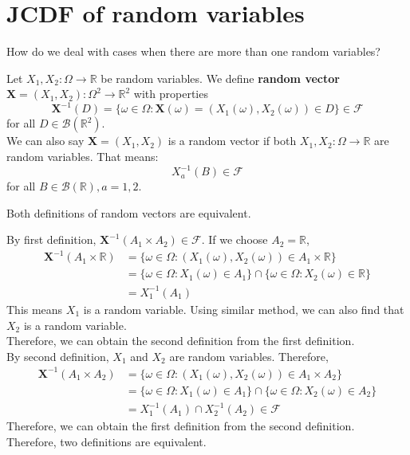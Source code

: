 \documentclass{huhtakm-template-book}
\begin{document}
\section{JCDF of random variables}
    How do we deal with cases when there are more than one random variables?
    \begin{defn}
	Let $X_{1},X_{2}:\Omega\to\mathbb{R}$ be random variables. We define \textbf{random vector} $\mathbf{X}=(X_{1},X_{2}):\Omega^{2}\to\mathbb{R}^{2}$ with properties
        \begin{equation*}
		    \mathbf{X}^{-1}(D)=\{\omega\in\Omega:\mathbf{X}(\omega)=(X_{1}(\omega),X_{2}(\omega))\in D\}\in\mathcal{F}
        \end{equation*}
        for all $D\in\mathcal{B}(\mathbb{R}^{2})$.\\
	    We can also say $\mathbf{X}=(X_{1},X_{2})$ is a random vector if both $X_{1},X_{2}:\Omega\to\mathbb{R}$ are random variables. That means:
        \begin{equation*}
            X_{a}^{-1}(B)\in\mathcal{F}
        \end{equation*}
        for all $B\in\mathcal{B}(\mathbb{R}),a=1,2$.
    \end{defn}
    \begin{cla}
        Both definitions of random vectors are equivalent.
    \end{cla}
    \begin{proofing}
	    By first definition, $\mathbf{X}^{-1}(A_{1}\times A_{2})\in\mathcal{F}$. If we choose $A_{2}=\mathbb{R}$,
        \begin{align*}
		    \mathbf{X}^{-1}(A_{1}\times \mathbb{R})&=\{\omega\in\Omega:(X_{1}(\omega),X_{2}(\omega))\in A_{1}\times\mathbb{R}\}\\
            &=\{\omega\in\Omega:X_{1}(\omega)\in A_{1}\}\cap\{\omega\in\Omega:X_{2}(\omega)\in\mathbb{R}\}\\
            &=X_{1}^{-1}(A_{1})
        \end{align*}
        This means $X_{1}$ is a random variable. Using similar method, we can also find that $X_{2}$ is a random variable.\\
        Therefore, we can obtain the second definition from the first definition.\\
        By second definition, $X_{1}$ and $X_{2}$ are random variables. Therefore,
        \begin{align*}
		    \mathbf{X}^{-1}(A_{1}\times A_{2})&=\{\omega\in\Omega:(X_{1}(\omega),X_{2}(\omega))\in A_{1}\times A_{2}\}\\
            &=\{\omega\in\Omega:X_{1}(\omega)\in A_{1}\}\cap\{\omega\in\Omega:X_{2}(\omega)\in A_{2}\}\\
            &=X_{1}^{-1}(A_{1})\cap X_{2}^{-1}(A_{2})\in\mathcal{F}
        \end{align*}
        Therefore, we can obtain the first definition from the second definition.\\
        Therefore, two definitions are equivalent.
    \end{proofing}
\end{document}
